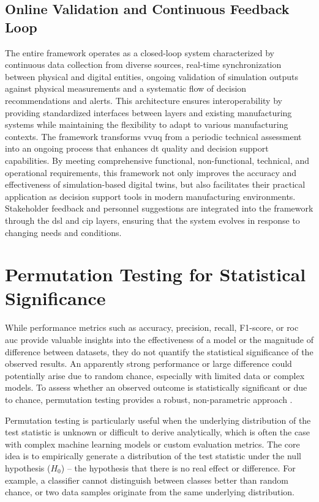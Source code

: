 \subsection{Online Validation and Continuous Feedback Loop}
\label{sec:online-validation}
The entire framework operates as a closed-loop system characterized by continuous data collection from diverse sources, real-time synchronization between physical and digital entities, ongoing validation of simulation outputs against physical measurements and a systematic flow of decision recommendations and alerts. This architecture ensures interoperability by providing standardized interfaces between layers and existing manufacturing systems while maintaining the flexibility to adapt to various manufacturing contexts. The framework transforms \gls{vvuq} from a periodic technical assessment into an ongoing process that enhances \gls{dt} quality and decision support capabilities. By meeting comprehensive functional, non-functional, technical, and operational requirements, this framework not only improves the accuracy and effectiveness of simulation-based digital twins, but also facilitates their practical application as decision support tools in modern manufacturing environments. Stakeholder feedback and personnel suggestions are integrated into the framework through the \gls{dsl} and \gls{cip} layers, ensuring that the system evolves in response to changing needs and conditions.

\section{Permutation Testing for Statistical Significance}
\label{sec:permtest}

While performance metrics such as accuracy, precision, recall, F1-score, or \gls{roc} \gls{auc} provide valuable insights into the effectiveness of a model or the magnitude of difference between datasets, they do not quantify the statistical significance of the observed results. An apparently strong performance or large difference could potentially arise due to random chance, especially with limited data or complex models. To assess whether an observed outcome is statistically significant or due to chance, permutation testing provides a robust, non-parametric approach \autocite{welch1990construction}.

Permutation testing is particularly useful when the underlying distribution of the test statistic is unknown or difficult to derive analytically, which is often the case with complex machine learning models or custom evaluation metrics. The core idea is to empirically generate a distribution of the test statistic under the null hypothesis ($H_0$) – the hypothesis that there is no real effect or difference. For example, a classifier cannot distinguish between classes better than random chance, or two data samples originate from the same underlying distribution.

